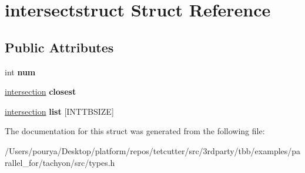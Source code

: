 \hypertarget{structintersectstruct}{}\section{intersectstruct Struct Reference}
\label{structintersectstruct}
\subsection*{Public Attributes}
\begin{DoxyCompactItemize}
\item 
\hypertarget{structintersectstruct_a0c29ce4debea8ec2db8447550db4ebc2}{}int {\bfseries num}\label{structintersectstruct_a0c29ce4debea8ec2db8447550db4ebc2}

\item 
\hypertarget{structintersectstruct_a6f3c2373fef51db8300aa34e1c6ca0d9}{}\hyperlink{structintersection}{intersection} {\bfseries closest}\label{structintersectstruct_a6f3c2373fef51db8300aa34e1c6ca0d9}

\item 
\hypertarget{structintersectstruct_a5409e3e7ff1e7e27eaf744a9e54bc00c}{}\hyperlink{structintersection}{intersection} {\bfseries list} \mbox{[}I\+N\+T\+T\+B\+S\+I\+Z\+E\mbox{]}\label{structintersectstruct_a5409e3e7ff1e7e27eaf744a9e54bc00c}

\end{DoxyCompactItemize}


The documentation for this struct was generated from the following file\+:\begin{DoxyCompactItemize}
\item 
/\+Users/pourya/\+Desktop/platform/repos/tetcutter/src/3rdparty/tbb/examples/parallel\+\_\+for/tachyon/src/types.\+h\end{DoxyCompactItemize}
